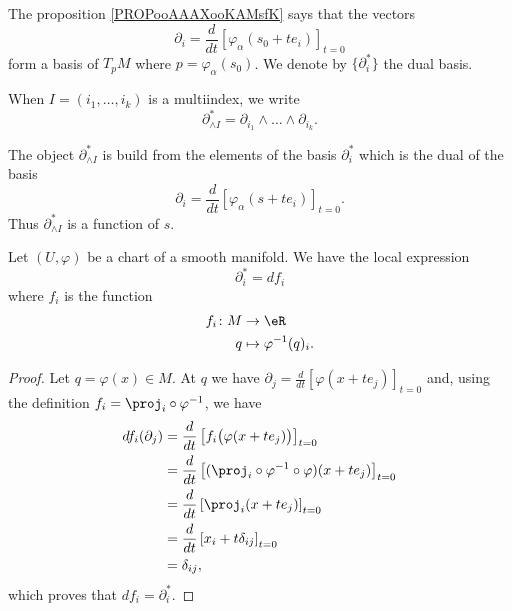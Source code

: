 The proposition \ref{PROPooAAAXooKAMsfK} says that the vectors
\begin{equation}
	\partial_i=\frac{d}{dt} \left[ \varphi_{\alpha}(s_0+te_i)  \right]_{t=0}
\end{equation}
form a basis of \( T_pM\) where \( p=\varphi_{\alpha}(s_0)\). We denote by \( \{ \partial_{i}^* \}\) the dual basis.

\begin{normaltext}
	When \( I=(i_1,\ldots,i_k)\) is a multiindex, we write
	\begin{equation}
		\partial^*_{\wedge I}=\partial_{i_1}\wedge\ldots\wedge\partial_{i_k}.
	\end{equation}
\end{normaltext}

\begin{normaltext}
	The object \( \partial^*_{\wedge I}\) is build from the elements of the basis \( \partial_i^*\) which is the dual of the basis
	\begin{equation}
		\partial_i=\frac{d}{dt} \left[ \varphi_{\alpha}(s+te_i)  \right]_{t=0}.
	\end{equation}
	Thus \( \partial^*_{\wedge I}\) is a function of \( s\).
\end{normaltext}

\begin{lemma}		\label{LEMooKCBSooPjEwEl}
	Let \( (U,\varphi)\) be a chart of a smooth manifold. We have the local expression
	\begin{equation}
		\partial^*_i=df_i
	\end{equation}
	where \( f_i\) is the function
	\begin{equation}
		\begin{aligned}
			f_i\colon M & \to \eR                    \\
			q           & \mapsto \varphi^{-1}(q)_i.
		\end{aligned}
	\end{equation}
\end{lemma}

\begin{proof}
	Let \( q=\varphi(x)\in M\). At \( q\) we have \( \partial_j=\frac{d}{dt} \left[ \varphi(x+te_j)  \right]_{t=0}\) and, using the definition \( f_i=\proj_i\circ\varphi^{-1}\), we have
	\begin{subequations}
		\begin{align}
			df_i(\partial_j) & =\frac{d}{dt} \left[ f_i\big( \varphi(x+te_j) \big)  \right]_{t=0}                 \\
			                 & =\frac{d}{dt} \left[ (\proj_i\circ\varphi^{-1}\circ\varphi)(x+te_j)  \right]_{t=0} \\
			                 & =\frac{d}{dt} \left[ \proj_i(x+te_j)  \right]_{t=0}                                \\
			                 & =\frac{d}{dt} \left[ x_i+t\delta_{ij}  \right]_{t=0}                               \\
			                 & =\delta_{ij},
		\end{align}
	\end{subequations}
	which proves that \( df_i=\partial^*_i\).
\end{proof}

